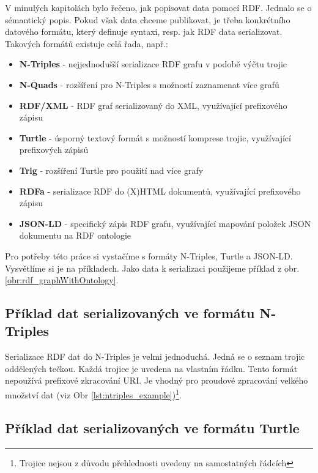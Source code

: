 V minulých kapitolách bylo řečeno, jak popisovat data pomocí RDF. Jednalo se o sémantický popis. Pokud však data chceme publikovat, je třeba konkrétního datového formátu, který definuje syntaxi, resp. jak RDF data serializovat. Takových formátů existuje celá řada, např.:

\begin{itemize}
\item \textbf{N-Triples\cite{N-Triples}} - nejjednodušší serializace RDF grafu v podobě výčtu trojic
\item \textbf{N-Quads\cite{N-Quads}} - rozšíření pro N-Triples s možností zaznamenat více grafů
\item \textbf{RDF/XML\cite{RDF/XML}} - RDF graf serializovaný do XML, využívající prefixového zápisu
\item \textbf{Turtle\cite{Turtle}} - úsporný textový formát s možností komprese trojic, využívající prefixových zápisů
\item \textbf{Trig\cite{Trig}} - rozšíření Turtle pro použití nad více grafy
\item \textbf{RDFa\cite{RDFa}} - serializace RDF do (X)HTML dokumentů, využívající prefixového zápisu
\item \textbf{JSON-LD\cite{JSON-LD}} - specifický zápis RDF grafu, využívající mapování položek JSON dokumentu na RDF ontologie
\end{itemize}

Pro potřeby této práce si vystačíme s formáty N-Triples, Turtle a JSON-LD. Vysvětlíme si je na příkladech. Jako data k serializaci použijeme příklad z obr. \ref{obr:rdf_graphWithOntology}.

\subsection{Příklad dat serializovaných ve formátu N-Triples}

Serializace RDF dat do N-Triples je velmi jednoduchá. Jedná se o seznam trojic oddělených tečkou. Každá trojice je uvedena na vlastním řádku. Tento formát nepoužívá prefixové zkracování URI. Je vhodný pro proudové zpracování velkého množství dat (viz Obr \ref{lst:ntriples_example})\footnote{Trojice nejsou z důvodu přehlednosti uvedeny na samostatných řádcích}.\\



\subsection{Příklad dat serializovaných ve formátu Turtle}

